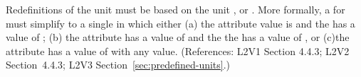 Redefinitions of the  unit  must be based on
the unit ,  or .
More formally, a \UnitDefinition for  must simplify to a
single \Unit in which either (a) the 
attribute value is  and the  has a value of
; (b) the  attribute has a value of
 and the the  has a value of , or (c)the
 attribute has a value of  with
any  value.  (References: L2V1 Section 4.4.3; L2V2
Section~4.4.3; L2V3 Section~\ref{sec:predefined-units}.)
